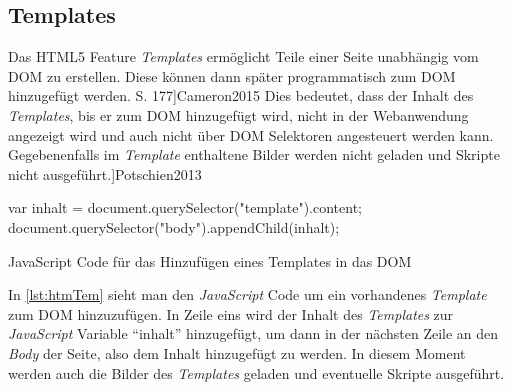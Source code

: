 \documentclass[12pt, paper=a4, bibtotoc, toc=listof, headsepline=true]{scrreprt}
\renewcommand{\smfootcite}[2][2]{\relax}
\begin{document}
			\subsection{Templates}
			\label{subsec:Templates}
			Das \ac{HTML5} Feature \emph{Templates} ermöglicht Teile einer Seite unabhängig vom \ac{DOM} zu erstellen. Diese können dann später programmatisch zum \ac{DOM} hinzugefügt werden.\smfootcite[ vgl.][ S. 177]{Cameron2015} Dies bedeutet, dass der Inhalt des \emph{Templates}, bis er zum \ac{DOM} hinzugefügt wird, nicht in der Webanwendung angezeigt wird und auch nicht über \ac{DOM} Selektoren angesteuert werden kann. Gegebenenfalls im \emph{Template} enthaltene Bilder werden nicht geladen und Skripte nicht ausgeführt.\smfootcite[ vgl.][]{Potschien2013} 
			\begin{listing}
				\begin{JavaScriptcode*}{}
var inhalt = document.querySelector("template").content;
document.querySelector("body").appendChild(inhalt);
				\end{JavaScriptcode*}
				\caption{JavaScript Code für das Hinzufügen eines Templates in das DOM}
				\label{lst:htmTem}
			\end{listing}
			In \ref{lst:htmTem} sieht man den \emph{JavaScript} Code um ein vorhandenes \emph{Template} zum \ac{DOM} hinzuzufügen. In Zeile eins wird der Inhalt des \emph{Templates} zur \emph{JavaScript} Variable \enquote{inhalt} hinzugefügt, um dann in der nächsten Zeile an den \emph{Body} der Seite, also dem Inhalt hinzugefügt zu werden. In diesem Moment werden auch die Bilder des \emph{Templates} geladen und eventuelle Skripte ausgeführt.
\end{document}
